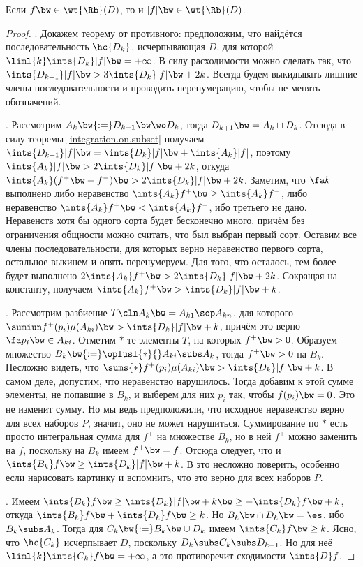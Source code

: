 \documentclass[a4paper]{article}
\newcommand{\Rbt}{\wt{\Rb}}
\begin{document}
\begin{theorem} \label{abs.int}
Если $f \bw\in \Rbt(D)$, то и $|f| \bw\in \Rbt(D)$.
\end{theorem}
\begin{proof}
. Докажем теорему от противного: предположим, что найдётся последовательность $\hc{D_k}$,
исчерпывающая $D$, для которой $\liml{k} \ints{D_k} |f| \bw= +\infty$. В силу расходимости можно
сделать так, что $\ints{D_{k+1}} |f| \bw> 3\ints{D_k} |f| \bw+ 2k$. Всегда будем выкидывать лишние члены
последовательности и проводить перенумерацию, чтобы не менять обозначений.

. Рассмотрим $A_k \bw{:=} D_{k+1} \bw\wo D_k$, тогда $D_{k+1} \bw= A_k \sqcup D_k$. Отсюда в силу
теоремы \ref{integration.on.subset} получаем
$\ints{D_{k+1}}|f| \bw=\ints{D_k}|f| \bw+ \ints{A_k}|f|$, поэтому $\ints{A_k}|f| \bw> 2 \ints{D_k}|f| \bw+
2k$, откуда $\ints{A_k}(f^+ \bw+ f^-) \bw> 2\ints{D_k}|f| \bw+ 2k$. Заметим, что $\fa k$ выполнено либо
неравенство $\ints{A_k}f^+ \bw\ge \ints{A_k}f^-$, либо неравенство $\ints{A_k} f^+ \bw< \ints{A_k}f^-$, ибо
третьего не дано. Неравенств хотя бы одного сорта будет бесконечно много, причём без ограничения
общности можно считать, что был выбран первый сорт. Оставим все члены последовательности, для которых
верно неравенство первого сорта, остальное выкинем и опять перенумеруем. Для того, что осталось, тем
более будет выполнено $2 \ints{A_k}f^+ \bw>2 \ints{D_k}|f| \bw+ 2k$. Сокращая на константу,
получаем $\ints{A_k}f^+ \bw> \ints{D_k}|f| \bw+ k$.

. Рассмотрим разбиение $T\cln A_k \bw= A_{k1}\sop A_{kn}$, для которого $\sumiun
f^+(p_i)\mu(A_{ki}) \bw> \ints{D_k}|f| \bw+ k$, причём это верно $\fa p_i \bw\in A_{ki}$. Отметим $*$ те
элементы $T$, на которых $f^+ \bw> 0$. Образуем множество $B_k \bw{:=} \oplusl{*}{}A_{ki} \subs
A_k$, тогда $f^+ \bw> 0$ на $B_k$. Несложно видеть, что $\sums{*} f^+(p_i)\mu(A_{ki}) \bw>
\ints{D_k}|f| \bw+ k$. В самом деле, допустим, что неравенство нарушилось. Тогда добавим к этой сумме
элементы, не попавшие в $B_k$, и выберем для них $p_i$ так, чтобы $f(p_i) \bw= 0$. Это не изменит
сумму. Но мы ведь предположили, что исходное неравенство верно для всех наборов $P$, значит, оно не
может нарушиться. Суммирование по $*$ есть просто интегральная сумма для $f^+$ на множестве $B_k$,
но в ней $f^+$ можно заменить на $f$, поскольку на $B_k$ имеем $f^+\bw=f$. Отсюда следует, что и
$\ints{B_k} f \bw\ge \ints{D_k}|f| \bw+ k$. В это несложно поверить, особенно если нарисовать картинку
и вспомнить, что это верно для всех наборов $P$.

. Имеем $\ints{B_k}f \bw\ge \ints{D_k}|f| \bw+ k \bw\ge -\ints{D_k} f \bw+ k$, откуда $\ints{B_k}f
\bw+ \ints{D_k}f \bw\ge k$. Но $B_k \bw\cap D_k \bw= \es$, ибо $B_k \subs A_k$. Тогда для $C_k \bw{:=} B_k \bw\cup
D_k$ имеем $\ints{C_k} f \bw\ge k$. Ясно, что $\hc{C_k}$ исчерпывает $D$, поскольку $D_k \subs C_k
\subs D_{k+1}$. Но для неё $\liml{k} \ints{C_k}f \bw= +\infty$, а это противоречит сходимости
$\ints{D} f$.
\end{proof}
\end{document}
